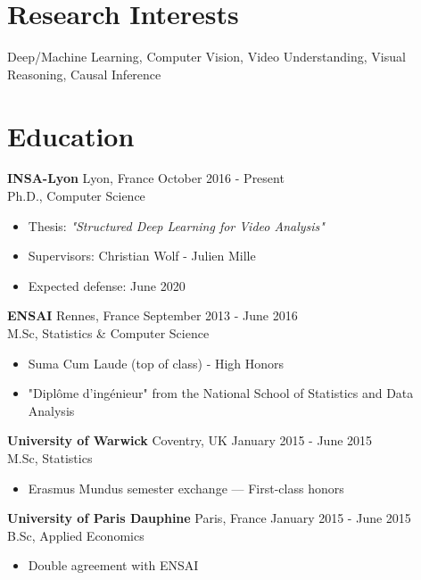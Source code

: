\documentclass[10pt]{res} %
\begin{document}
\begin{resume}

 
\section{\large Research Interests}  
Deep/Machine Learning, Computer Vision, Video Understanding, Visual Reasoning, Causal Inference


\section{\large Education}
\textbf{INSA-Lyon} \hfill Lyon, France \hfill October 2016 - Present \\
Ph.D., Computer Science
\begin{itemize}
\item  Thesis: {\sl "Structured Deep Learning for Video Analysis"}
\item  Supervisors: Christian Wolf - Julien Mille
\item  Expected defense: June 2020
\end{itemize}


\textbf{ENSAI} \hfill Rennes, France \hfill September 2013 - June 2016 \\
M.Sc, Statistics \& Computer Science
\begin{itemize}
\item Suma Cum Laude (top of class) - High Honors
\item "Diplôme d'ingénieur" from the National School of Statistics and Data Analysis
\end{itemize}

\textbf{University of Warwick} \hfill Coventry, UK \hfill January 2015 - June 2015 \\
M.Sc, Statistics
\begin{itemize}
\item Erasmus Mundus semester exchange --- First-class honors
\end{itemize}

\textbf{University of Paris Dauphine} \hfill Paris, France \hfill January 2015 - June 2015 \\
B.Sc, Applied Economics
\begin{itemize}
\item Double agreement with ENSAI
\end{itemize}


\end{resume}
\end{document}
